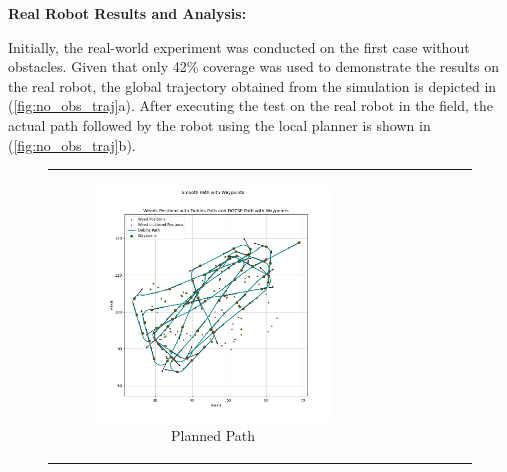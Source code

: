 \vspace*{6mm}   


\textbf{Real Robot Results and Analysis:}    

Initially, the real-world experiment was conducted on the first case without obstacles. Given that only 42\% coverage was used to demonstrate the results on the real robot, the global trajectory obtained from the simulation is depicted in (\autoref{fig:no_obs_traj}a). After executing the test on the real robot in the field, the actual path followed by the robot using the local planner is shown in (\autoref{fig:no_obs_traj}b).

\begin{figure}[H]
    \centering
    \begin{tabular}{cc} 
        \begin{subfigure}{0.4\textwidth}
            \centering
            \includegraphics[width=\textwidth]{Images/real_robot/no_obs_path.png}
            \caption{Planned Path}
        \end{subfigure} 
        &
        \begin{subfigure}{0.4\textwidth}
            \centering

\end{subfigure}
\end{tabular}
\end{figure}
